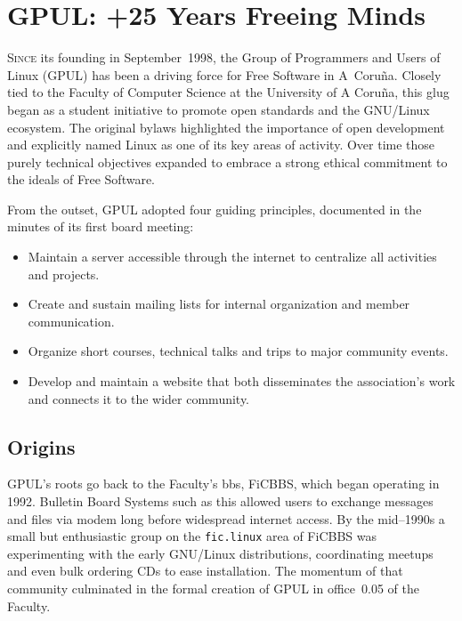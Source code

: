 %

\chapter{GPUL: +25 Years Freeing Minds}

\lettrine{S}{ince} its founding in September~1998, the Group of Programmers
and Users of Linux (GPUL) has been a driving force for Free Software in A~Coru\~na.
Closely tied to the Faculty of Computer Science at the University of
A Coru\~na, this \gls{glug} began as a student initiative to promote open
standards and the GNU/Linux ecosystem. The original bylaws highlighted
the importance of open development and explicitly named Linux as one of
its key areas of activity. Over time those purely technical objectives
expanded to embrace a strong ethical commitment to the ideals of Free
Software.

From the outset, GPUL adopted four guiding principles, documented in the
minutes of its first board meeting:
\begin{itemize}
  \item Maintain a server accessible through the internet to centralize
    all activities and projects.
  \item Create and sustain mailing lists for internal organization and
    member communication.
  \item Organize short courses, technical talks and trips to major
    community events.
  \item Develop and maintain a website that both disseminates the
    association's work and connects it to the wider community.
\end{itemize}

\section{Origins}

GPUL's roots go back to the Faculty's \gls{bbs}, FiCBBS, which began
operating in 1992. Bulletin Board Systems such as this allowed users to
exchange messages and files via modem long before widespread internet
access. By the mid--1990s a small but enthusiastic group on the
\texttt{fic.linux} area of FiCBBS was experimenting with the early
GNU/Linux distributions, coordinating meetups and even bulk ordering CDs
to ease installation. The momentum of that community culminated in the
formal creation of GPUL in office~0.05 of the Faculty.

